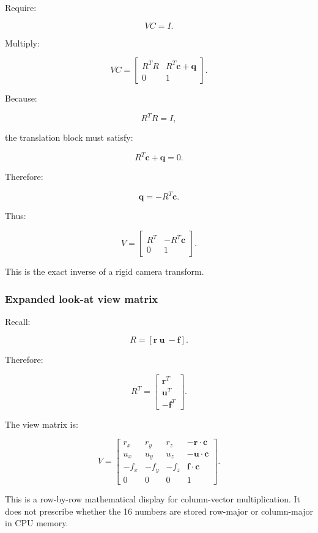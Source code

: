 Require:

\[
 VC=I.
\]

Multiply:

\[
 VC= \begin{bmatrix} R^TR&R^T\mathbf c+\mathbf q\\ 0&1 \end{bmatrix}.
\]

Because:

\[
 R^TR=I,
\]

the translation block must satisfy:

\[
 R^T\mathbf c+\mathbf q=0.
\]

Therefore:

\[
 \mathbf q=-R^T\mathbf c.
\]

Thus:

\[
 \boxed{ V= \begin{bmatrix} R^T&-R^T\mathbf c\\ 0&1 \end{bmatrix} }.
\]

This is the exact inverse of a rigid camera transform.

\subsubsection{Expanded look-at view matrix}\label{expanded-look-at-view-matrix}

Recall:

\[
 R=[\mathbf r\ \mathbf u\ -\mathbf f].
\]

Therefore:

\[
 R^T= \begin{bmatrix} \mathbf r^T\\ \mathbf u^T\\ -\mathbf f^T \end{bmatrix}.
\]

The view matrix is:

\[
 \boxed{ V= \begin{bmatrix} r_x&r_y&r_z&-\mathbf r\cdot\mathbf c\\ u_x&u_y&u_z&-\mathbf u\cdot\mathbf c\\ -f_x&-f_y&-f_z&\mathbf f\cdot\mathbf c\\ 0&0&0&1 \end{bmatrix} }.
\]

This is a row-by-row mathematical display for column-vector multiplication. It does not prescribe whether the 16 numbers are stored row-major or column-major in CPU memory.

